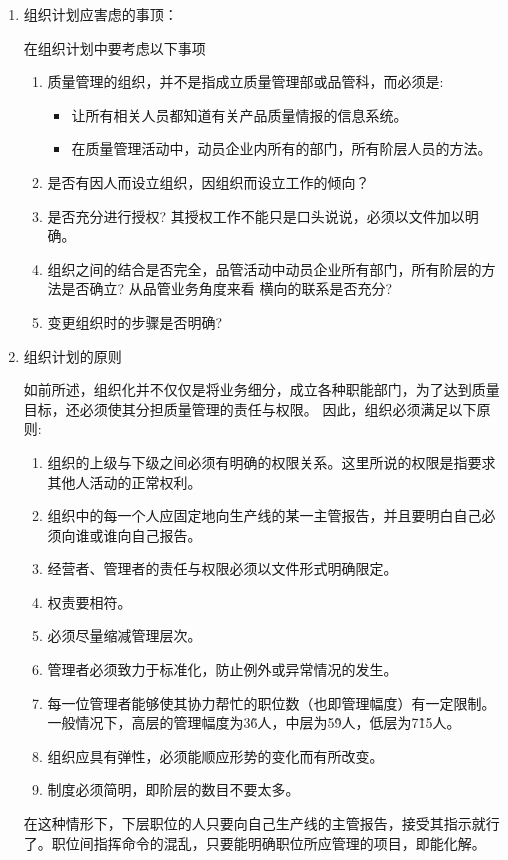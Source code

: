     \begin{enumerate}
        \item 组织计划应害虑的事顶：

            在组织计划中要考虑以下事项

            \begin{enumerate}
                \item 质量管理的组织，并不是指成立质量管理部或品管科，而必须是:
                    \begin{itemize}
                        \item 让所有相关人员都知道有关产品质量情报的信息系统。
                        \item 在质量管理活动中，动员企业内所有的部门，所有阶层人员的方法。
                    \end{itemize}
                \item 是否有因人而设立组织，因组织而设立工作的倾向？
                \item 是否充分进行授权? 其授权工作不能只是口头说说，必须以文件加以明确。
                \item 组织之间的结合是否完全，品管活动中动员企业所有部门，所有阶层的方法是否确立? 从品管业务角度来看 横向的联系是否充分?
                \item 变更组织时的步骤是否明确?
             \end{enumerate}

        \item 组织计划的原则

        如前所述，组织化并不仅仅是将业务细分，成立各种职能部门，为了达到质量目标，还必须使其分担质量管理的责任与权限。 因此，组织必须满足以下原则:

            \begin{enumerate}
                \item 组织的上级与下级之间必须有明确的权限关系。这里所说的权限是指要求其他人活动的正常权利。
                \item 组织中的每一个人应固定地向生产线的某一主管报告，并且要明白自己必须向谁或谁向自己报告。
                \item 经营者、管理者的责任与权限必须以文件形式明确限定。
                \item 权责要相符。
                \item 必须尽量缩减管理层次。
                \item 管理者必须致力于标准化，防止例外或异常情况的发生。
                \item 每一位管理者能够使其协力帮忙的职位数（也即管理幅度）有一定限制。一般情况下，高层的管理幅度为3\~6人，中层为5\~9人，低层为7\~15人。
                \item 组织应具有弹性，必须能顺应形势的变化而有所改变。
                \item 制度必须简明，即阶层的数目不要太多。
            \end{enumerate}

        在这种情形下，下层职位的人只要向自己生产线的主管报告，接受其指示就行了。职位间指挥命令的混乱，只要能明确职位所应管理的项目，即能化解。
    \end{enumerate}
